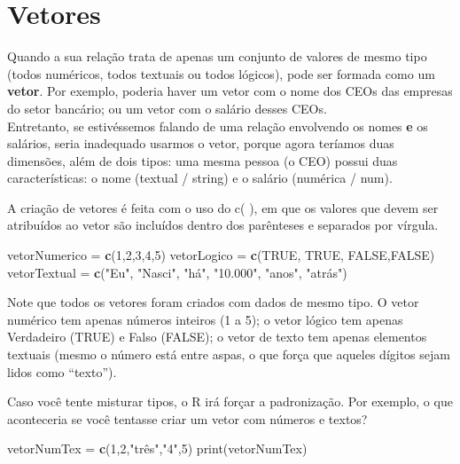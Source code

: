 \documentclass[
]{book}
\newenvironment{Shaded}{\begin{snugshade}}{\end{snugshade}}
\newcommand{\DecValTok}[1]{\textcolor[rgb]{0.00,0.00,0.81}{#1}}
\newcommand{\KeywordTok}[1]{\textcolor[rgb]{0.13,0.29,0.53}{\textbf{#1}}}
\newcommand{\NormalTok}[1]{#1}
\newcommand{\OtherTok}[1]{\textcolor[rgb]{0.56,0.35,0.01}{#1}}
\newcommand{\StringTok}[1]{\textcolor[rgb]{0.31,0.60,0.02}{#1}}
\begin{document}
\hypertarget{vetores}{%
\section{Vetores}\label{vetores}}

Quando a sua relação trata de apenas um conjunto de valores de mesmo tipo (todos numéricos, todos textuais ou todos lógicos), pode ser formada como um \textbf{vetor}. Por exemplo, poderia haver um vetor com o nome dos CEOs das empresas do setor bancário; ou um vetor com o salário desses CEOs.\\
Entretanto, se estivéssemos falando de uma relação envolvendo os nomes \textbf{e} os salários, seria inadequado usarmos o vetor, porque agora teríamos duas dimensões, além de dois tipos: uma mesma pessoa (o CEO) possui duas características: o nome (textual / string) e o salário (numérica / num).

A criação de vetores é feita com o uso do c( ), em que os valores que devem ser atribuídos ao vetor são incluídos dentro dos parênteses e separados por vírgula.

\begin{Shaded}
\begin{Highlighting}[]
\NormalTok{vetorNumerico =}\StringTok{ }\KeywordTok{c}\NormalTok{(}\DecValTok{1}\NormalTok{,}\DecValTok{2}\NormalTok{,}\DecValTok{3}\NormalTok{,}\DecValTok{4}\NormalTok{,}\DecValTok{5}\NormalTok{)}
\NormalTok{vetorLogico =}\StringTok{ }\KeywordTok{c}\NormalTok{(}\OtherTok{TRUE}\NormalTok{, }\OtherTok{TRUE}\NormalTok{, }\OtherTok{FALSE}\NormalTok{,}\OtherTok{FALSE}\NormalTok{)}
\NormalTok{vetorTextual =}\StringTok{ }\KeywordTok{c}\NormalTok{(}\StringTok{"Eu"}\NormalTok{, }\StringTok{"Nasci"}\NormalTok{, }\StringTok{"há"}\NormalTok{, }\StringTok{"10.000"}\NormalTok{, }\StringTok{"anos"}\NormalTok{, }\StringTok{"atrás"}\NormalTok{)}
\end{Highlighting}
\end{Shaded}

Note que todos os vetores foram criados com dados de mesmo tipo. O vetor numérico tem apenas números inteiros (1 a 5); o vetor lógico tem apenas Verdadeiro (TRUE) e Falso (FALSE); o vetor de texto tem apenas elementos textuais (mesmo o número está entre aspas, o que força que aqueles dígitos sejam lidos como ``texto'').

Caso você tente misturar tipos, o R irá forçar a padronização. Por exemplo, o que aconteceria se você tentasse criar um vetor com números e textos?

\begin{Shaded}
\begin{Highlighting}[]
\NormalTok{vetorNumTex =}\StringTok{ }\KeywordTok{c}\NormalTok{(}\DecValTok{1}\NormalTok{,}\DecValTok{2}\NormalTok{,}\StringTok{"três","}\DecValTok{4}\StringTok{",5)}
\StringTok{print(vetorNumTex)}
\end{Highlighting}
\end{Shaded}
\end{document}
